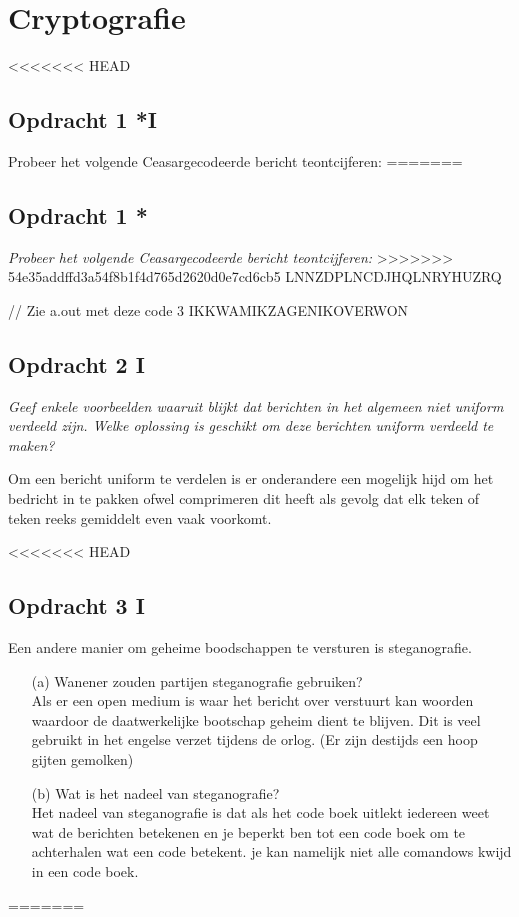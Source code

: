 \chapter{Cryptografie}
<<<<<<< HEAD

\section{Opdracht 1 *I}
Probeer het volgende Ceasargecodeerde bericht teontcijferen:
=======
\section{Opdracht 1 *}
\emph{Probeer het volgende Ceasargecodeerde bericht teontcijferen:}
>>>>>>> 54e35addffd3a54f8b1f4d765d2620d0e7cd6cb5
LNNZDPLNCDJHQLNRYHUZRQ

// Zie a.out met deze code 3
IKKWAMIKZAGENIKOVERWON

\section{Opdracht 2 I}
\emph{Geef enkele voorbeelden waaruit blijkt dat berichten in het algemeen niet uniform verdeeld zijn. Welke oplossing is geschikt om deze berichten uniform verdeeld te maken?}

Om een bericht uniform te verdelen is er onderandere een mogelijk hijd om het bedricht in te pakken ofwel comprimeren dit heeft als gevolg dat elk teken of teken reeks gemiddelt even vaak voorkomt.

<<<<<<< HEAD
\section{Opdracht 3 I}
Een andere manier om geheime boodschappen te versturen is steganografie.
\begin{itemize}
  \item[(a)] Wanener zouden partijen steganografie gebruiken? \\
    Als er een open medium is waar het bericht over verstuurt kan woorden waardoor de daatwerkelijke bootschap geheim dient te blijven. Dit is veel gebruikt in het engelse verzet tijdens de orlog. (Er zijn destijds een hoop gijten gemolken)
  \item[(b)] Wat is het nadeel van steganografie?\\
    Het nadeel van steganografie is dat als het code boek uitlekt iedereen weet wat de berichten betekenen en je beperkt ben tot een code boek om te achterhalen wat een code betekent. je kan namelijk niet alle comandows kwijd in een code boek.
\end{itemize}
=======
